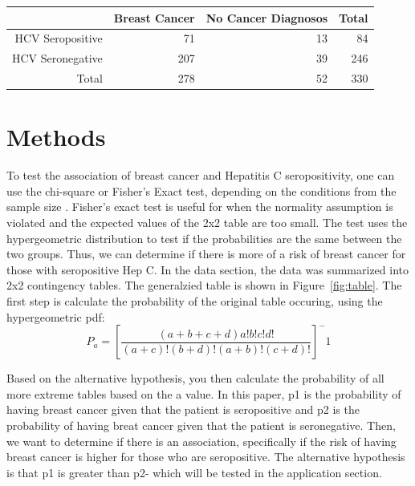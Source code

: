 \documentclass[12pt, titlepage]{article}
\begin{document}
\begin{table}[!htb]
\begin{center}
\label{tab:older}
\begin{tabular}{rrrr}
  \toprule
  & Breast Cancer & No Cancer Diagnosos & Total\\
  \midrule
  HCV Seropositive & 71 & 13 & 84 \\ 
  HCV Seronegative & 207 & 39 & 246 \\
  \midrule 
  Total & 278 & 52 & 330 \\ 
  \bottomrule
\end{tabular}
\end{center}
\end{table}

\vspace{1cm}



\section{Methods}
\label{sec:methods}

To test the association of breast cancer and Hepatitis C seropositivity, one can use
the chi-square or Fisher's Exact test, depending on the
conditions from the sample size \citep{warner2013testing}. Fisher's
exact test is useful for when the normality assumption is violated 
and the expected values of the 2x2 table are too small. The test uses 
the hypergeometric distribution to test if the probabilities are
the same between the two groups. Thus, we can determine if there is 
more of a risk of breast cancer for those with seropositive Hep C.
In the data section, the data was summarized into 2x2 contingency tables.
The generalzied table is shown in Figure~\ref{fig:table}.
The first step is calculate the probability of the original table occuring,
using the hypergeometric pdf:
\begin{equation}
P_a=[\frac{(a+b+c+d)a!b!c!d!}{(a+c)!(b+d)!(a+b)!(c+d)!}]^-1
\end{equation}

Based on the alternative hypothesis, you then calculate the probability of 
all more extreme tables based on the a value. In this paper, p1 is the
probability of having breast cancer given that the patient is seropositive
and p2 is the probability of having breat cancer given that the patient
is seronegative. Then, we want to determine if there is an association,
specifically if the risk of having breast cancer is higher for those who
are seropositive. The alternative hypothesis is that p1 is greater than p2-
which will be tested in the application section.
\end{document}
